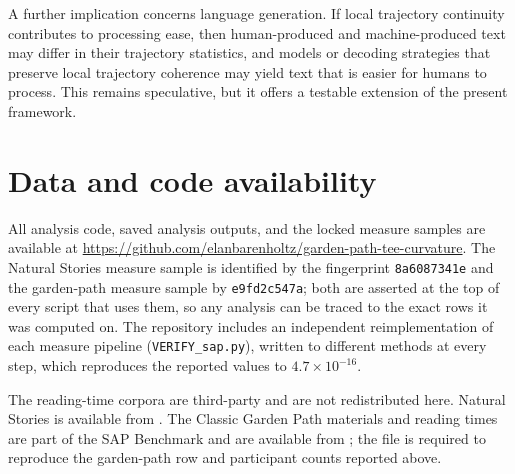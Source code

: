 \documentclass[12pt]{article}
\newcommand{\new}[1]{{\bfseries #1}}
\begin{document}
A further implication concerns language generation. If local trajectory continuity contributes to processing ease, then human-produced and machine-produced text may differ in their trajectory statistics, and models or decoding strategies that preserve local trajectory coherence may yield text that is easier for humans to process. This remains speculative, but it offers a testable extension of the present framework.

\new{\section*{Data and code availability}

All analysis code, saved analysis outputs, and the locked measure samples are
available at \url{https://github.com/elanbarenholtz/garden-path-tee-curvature}.
The Natural Stories measure sample is identified by the fingerprint
\texttt{8a6087341e} and the garden-path measure sample by \texttt{e9fd2c547a};
both are asserted at the top of every script that uses them, so any analysis can
be traced to the exact rows it was computed on. The repository includes an
independent reimplementation of each measure pipeline
(\texttt{VERIFY\_sap.py}), written to different methods at every step, which
reproduces the reported values to $4.7 \times 10^{-16}$.

The reading-time corpora are third-party and are not redistributed here.
Natural Stories is available from \citet{futrell2018}. The Classic Garden Path
materials and reading times are part of the SAP Benchmark and are available from
\citet{huang2024}; the file is required to reproduce the garden-path row and
participant counts reported above.}



\end{document}
